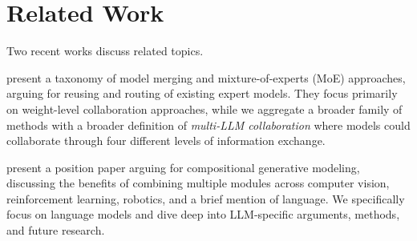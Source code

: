 \section{Related Work}
Two recent works discuss related topics. 

\citet{yadav2024survey} present a taxonomy of model merging and mixture-of-experts (MoE) approaches, arguing for reusing and routing of existing expert models. They focus primarily on weight-level collaboration approaches, while we aggregate a broader family of methods with a broader definition of \emph{multi-LLM collaboration} where models could collaborate through four different levels of information exchange.

\citet{duposition} present a position paper arguing for compositional generative modeling, discussing the benefits of combining multiple modules across computer vision, reinforcement learning, robotics, and a brief mention of language. We specifically focus on language models and dive deep into LLM-specific arguments, methods, and future research.
